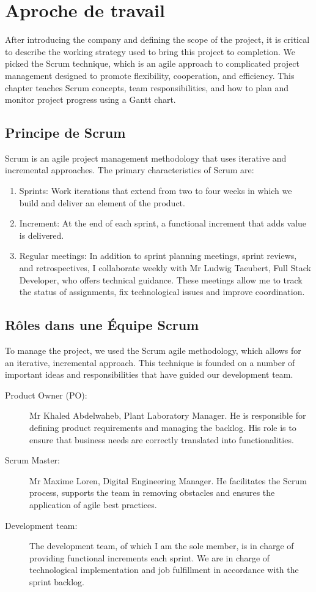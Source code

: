 \section{Aproche de travail}
After introducing the company and defining the scope of the project, it is critical to describe the working strategy used to bring this project to completion. We picked the Scrum technique, which is an agile approach to complicated project management designed to promote flexibility, cooperation, and efficiency. This chapter teaches Scrum concepts, team responsibilities, and how to plan and monitor project progress using a Gantt chart.

\subsection{Principe de Scrum}
Scrum is an agile project management methodology that uses iterative and incremental approaches. The primary characteristics of Scrum are:

\begin{enumerate}
  \item Sprints: Work iterations that extend from two to four weeks in which we build and deliver an element of the product.
  \item Increment: At the end of each sprint, a functional increment that adds value is delivered. 
  \item Regular meetings: In addition to sprint planning meetings, sprint reviews, and retrospectives, I collaborate weekly with Mr Ludwig Taeubert, Full Stack Developer, who offers technical guidance. These meetings allow me to track the status of assignments, fix technological issues and improve coordination.
 
\end{enumerate}




\subsection{Rôles dans une Équipe Scrum}
To manage the project, we used the Scrum agile methodology, which allows for an iterative, incremental approach. This technique is founded on a number of important ideas and responsibilities that have guided our development team.
\begin{description}
  \item[Product Owner (PO):] Mr Khaled Abdelwaheb, Plant Laboratory Manager. He is responsible for defining product requirements and managing the backlog. His role is to ensure that business needs are correctly translated into functionalities.
  \item[Scrum Master:] Mr Maxime Loren, Digital Engineering Manager. He facilitates the Scrum process, supports the team in removing obstacles and ensures the application of agile best practices.
  \item[Development team:] The development team, of which I am the sole member, is in charge of providing functional increments each sprint. We are in charge of technological implementation and job fulfillment in accordance with the sprint backlog.
\end{description}



